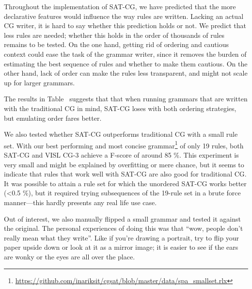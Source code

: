 Throughout the implementation of SAT-CG, we have predicted that the more declarative features would influence the way rules are written. 
Lacking an actual CG writer, it is hard to say whether this prediction holds or not.
We predict that less rules are needed; whether this holds in the order of thousands of rules remains to be tested. On the one hand, getting rid of ordering and cautious context could ease the task of the grammar writer, since it removes the burden of estimating the best sequence of rules and whether to make them cautious. On the other hand, lack of order can make the rules less transparent, and might not scale up for larger grammars.


The results in Table~ suggests that that when running grammars that are written
with the traditional CG in mind, SAT-CG loses with both ordering
strategies, but emulating order fares better.

We also tested whether SAT-CG outperforms traditional CG with a
small rule set. With our best performing and most concise
grammar\footnote{\url{https://github.com/inariksit/cgsat/blob/master/data/spa\_smallset.rlx}}
of only 19 rules, both SAT-CG and VISL CG-3  achieve a F-score of
around 85 \%. This experiment is very small and might be explained by
overfitting or mere chance, but it seems to indicate that rules that
work well with SAT-CG are also good for traditional CG.
It was possible to attain a rule set for which the unordered SAT-CG
works better (\textless0.5 \%), but it required trying
subsequences of the 19-rule set in a brute force manner---this hardly
presents any real life use case.


Out of interest, we also manually flipped a small grammar and tested it against the original.
The personal experiences of doing this was that ``wow, people don't really mean what they write''. Like if you're drawing a portrait, try to flip your paper upside down or look at it as a mirror image; it is easier to see if the ears are wonky or the eyes are all over the place.



